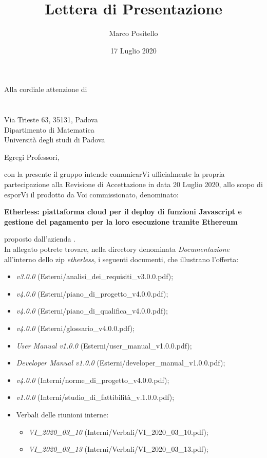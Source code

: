 \documentclass[a4paper]{letter}
\title{Lettera di Presentazione}
\author{Marco Positello}
\begin{document}
\begin{letter} {Alla cordiale attenzione di \\ \TV \\ \RC \\ Via Trieste 63, 35131, Padova\\ Dipartimento di Matematica \\ Università degli studi di Padova }
  \vspace*{-0.4\baselineskip}
\date{17 Luglio 2020}
\opening{Egregi Professori,}
con la presente il gruppo \Gruppo{} intende comunicarVi ufficialmente la propria partecipazione alla Revisione di Accettazione in data 20 Luglio 2020, allo scopo di esporVi il prodotto da Voi commissionato, denominato:
  \begin{center}
    \textbf{Etherless: piattaforma cloud per il deploy di funzioni Javascript e gestione del pagamento per la loro esecuzione tramite Ethereum}
  \end{center}
  proposto dall'azienda \Proponente.\\
  In allegato potrete trovare, nella directory denominata \textit{Documentazione} all'interno dello zip \textit{etherless}, i seguenti documenti, che illustrano l'offerta:
  \begin{itemize}
    \item \AdR{} \textit{v3.0.0} (Esterni/analisi\_dei\_requisiti\_v3.0.0.pdf);
    \item \PdP{} \textit{v4.0.0} (Esterni/piano\_di\_progetto\_v4.0.0.pdf);
    \item \PdQ{} \textit{v4.0.0} (Esterni/piano\_di\_qualifica\_v4.0.0.pdf);
    \item \Glossario{} \textit{v4.0.0} (Esterni/glossario\_v4.0.0.pdf);
		\item \textit{User Manual v1.0.0} (Esterni/user\_manual\_v1.0.0.pdf);
		\item \textit{Developer Manual v1.0.0} (Esterni/developer\_manual\_v1.0.0.pdf);
    \item \NdP{} \textit{v4.0.0} (Interni/norme\_di\_progetto\_v4.0.0.pdf);
    \item \SdF{} \textit{v1.0.0} (Interni/studio\_di\_fattibilità\_v.1.0.0.pdf);
    \item Verbali delle riunioni interne:
      \begin{itemize}
      				\item \textit{VI\_2020\_03\_10} (Interni/Verbali/VI\_2020\_03\_10.pdf);
				\item \textit{VI\_2020\_03\_13} (Interni/Verbali/VI\_2020\_03\_13.pdf);

\end{itemize}
\end{itemize}
\end{letter}
\end{document}
